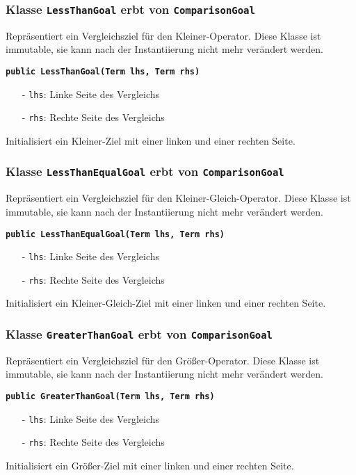 \documentclass[parskip=full,11pt,twoside]{scrartcl}
\begin{document}
\subsubsection{Klasse \texttt{LessThanGoal} erbt von \texttt{ComparisonGoal}}
Repräsentiert ein Vergleichsziel für den Kleiner-Operator. Diese Klasse ist immutable, sie kann nach der Instantiierung nicht mehr verändert werden.

\textbf{\texttt{public LessThanGoal(Term lhs, Term rhs)}}
\begin{itemize}[noitemsep]
	\item[-] \texttt{lhs}: Linke Seite des Vergleichs 
	\item[-] \texttt{rhs}: Rechte Seite des Vergleichs
\end{itemize}
Initialisiert ein Kleiner-Ziel mit einer linken und einer rechten Seite.

\subsubsection{Klasse \texttt{LessThanEqualGoal} erbt von \texttt{ComparisonGoal}}
Repräsentiert ein Vergleichsziel für den Kleiner-Gleich-Operator. Diese Klasse ist immutable, sie kann nach der Instantiierung nicht mehr verändert werden.

\textbf{\texttt{public LessThanEqualGoal(Term lhs, Term rhs)}}
\begin{itemize}[noitemsep]
	\item[-] \texttt{lhs}: Linke Seite des Vergleichs
	\item[-] \texttt{rhs}: Rechte Seite des Vergleichs
\end{itemize}
Initialisiert ein Kleiner-Gleich-Ziel mit einer linken und einer rechten Seite.

\subsubsection{Klasse \texttt{GreaterThanGoal} erbt von \texttt{ComparisonGoal}}
Repräsentiert ein Vergleichsziel für den Größer-Operator. Diese Klasse ist immutable, sie kann nach der Instantiierung nicht mehr verändert werden.

\textbf{\texttt{public GreaterThanGoal(Term lhs, Term rhs)}}
\begin{itemize}[noitemsep]
	\item[-] \texttt{lhs}: Linke Seite des Vergleichs
	\item[-] \texttt{rhs}: Rechte Seite des Vergleichs
\end{itemize}
Initialisiert ein Größer-Ziel mit einer linken und einer rechten Seite.
\end{document}
